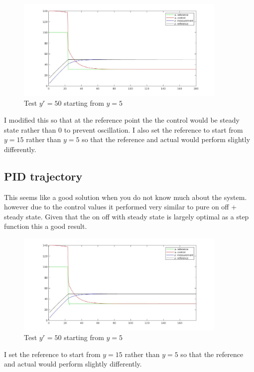 \documentclass{article}
\begin{document}
\begin{figure}[H]
    \centering
    \includegraphics[width=0.9\textwidth]{mpc_on_off.jpg}
    \caption{Test $y^r = 50$ starting from $y=5$}
    \label{fig:yr50}
\end{figure}

I modified this so that at the reference point the the control would be steady state rather than 0 to prevent oscillation.
I also set the reference to start from $y=15$ rather than $y=5$ so that the reference and actual would perform slightly differently.

\subsection{PID trajectory}

This seems like a good solution when you do not know much about the system. however due to the control values it performed very similar to pure on off + steady state. Given that the on off with steady state is largely optimal as a step function this a good result.

\begin{figure}[H]
    \centering
    \includegraphics[width=0.9\textwidth]{mpc_pid.jpg}
    \caption{Test $y^r = 50$ starting from $y=5$}
    \label{fig:yr50}
\end{figure}

I set the reference to start from $y=15$ rather than $y=5$ so that the reference and actual would perform slightly differently.
\end{document}
